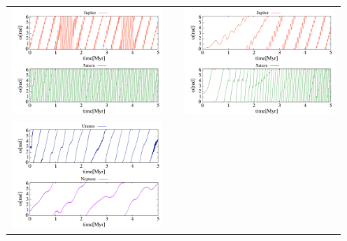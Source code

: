 \documentclass[11pt,a4paper,oneside,onecolumn]{jreport}
\begin{document}
\begin{figure}[H]
\begin{tabular}{ccc}
\begin{minipage}[t]{0.45\hsize}
\centering
\includegraphics[width=8cm]{./image/NoMove_smallomega_5Myr_JUPSAT.pdf}
\end{minipage} &
\begin{minipage}[t]{0.1\hsize}
\end{minipage} &
\begin{minipage}[t]{0.45\hsize}
\centering
\includegraphics[width=8cm]{./image/Move500kyr_smallomega_5Myr_JUPSAT.pdf}
\end{minipage}\\
\begin{minipage}[t]{0.45\hsize}
\centering
\includegraphics[width=8cm]{./image/NoMove_smallomega_5Myr_URANEP.pdf}
\end{minipage} &

\end{tabular}
\end{figure}
\end{document}
